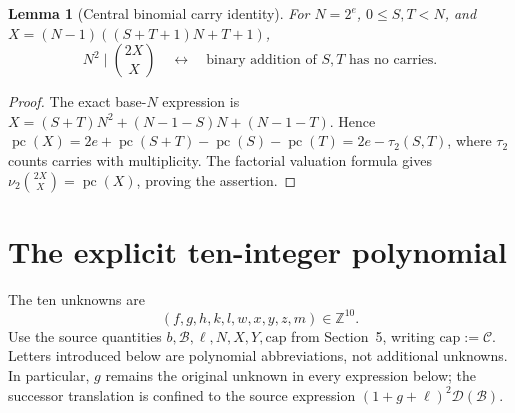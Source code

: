 \documentclass[11pt,letterpaper]{article}
\newtheorem{lemma}[theorem]{Lemma}
\theoremstyle{remark}\newtheorem{remark}[theorem]{Remark}
\newcommand{\Z}{\mathbb Z}\newcommand{\N}{\mathbb N}
\newcommand{\pc}{\operatorname{pc}}
\begin{document}
\begin{lemma}[Central binomial carry identity]\label{lem:binomial}
For $N=2^e$, $0\le S,T<N$, and
$X=(N-1)((S+T+1)N+T+1)$,
\[
N^2\mid\binom{2X}{X}
\quad\longleftrightarrow\quad
\text{binary addition of }S,T\text{ has no carries}.
\]
\end{lemma}
\begin{proof}
The exact base-$N$ expression is
$X=(S+T)N^2+(N-1-S)N+(N-1-T)$.
Hence $\pc(X)=2e+\pc(S+T)-\pc(S)-\pc(T)=2e-\tau_2(S,T)$,
where $\tau_2$ counts carries with multiplicity. The factorial valuation
formula gives $\nu_2\binom{2X}{X}=\pc(X)$, proving the assertion.
\end{proof}

\section{The explicit ten-integer polynomial}\label{sec:ten}
The ten unknowns are
\[
(f,g,h,k,l,w,x,y,z,m)\in\Z^{10}.
\]
Use the source quantities $b,\mathcal B,\ell,N,X,Y,\mathrm{cap}$
from Section~5, writing $\mathrm{cap}:=\mathscr C$. Letters introduced below are polynomial abbreviations,
not additional unknowns. In particular, $g$ remains the original unknown
in every expression below; the successor translation is confined to
the source expression $(1+g+\ell)^2\mathcal D(\mathcal B)$.
\end{document}
